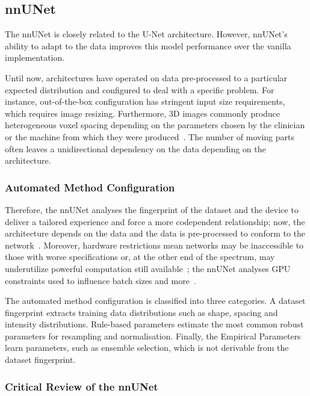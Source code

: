 \documentclass[11pt,twoside]{report}
\begin{document}
\subsection{nnUNet}\label{sect:nnunet}

The nnUNet is closely related to the U-Net architecture. However, nnUNet's ability to adapt to the data improves this model performance over the vanilla implementation.

Until now, architectures have operated on data pre-processed to a particular expected distribution and configured to deal with a specific problem. For instance, out-of-the-box configuration has stringent input size requirements, which requires image resizing. Furthermore, 3D images commonly produce heterogeneous voxel spacing depending on the parameters chosen by the clinician or the machine from which they were produced~\cite{nnunet}. The number of moving parts often leaves a unidirectional dependency on the data depending on the architecture. 

\subsubsection{Automated Method Configuration}\label{sect:nnunet-automated-method-configuration}

Therefore, the nnUNet analyses the fingerprint of the dataset and the device to deliver a tailored experience and force a more codependent relationship; now, the architecture depends on the data and the data is pre-processed to conform to the network~\cite{nnunet}. Moreover, hardware restrictions mean networks may be inaccessible to those with worse specifications or, at the other end of the spectrum, may underutilize powerful computation still available~\cite{nnunet}; the nnUNet analyses GPU constraints used to influence batch sizes and more~\cite{nnunet-git-paper}.

The automated method configuration is classified into three categories. A dataset fingerprint extracts training data distributions such as shape, spacing and intensity distributions. Rule-based parameters estimate the most common robust parameters for resampling and normalisation. Finally, the Empirical Parameters learn parameters, such as ensemble selection, which is not derivable from the dataset fingerprint.

\subsubsection{Critical Review of the nnUNet}
\end{document}
